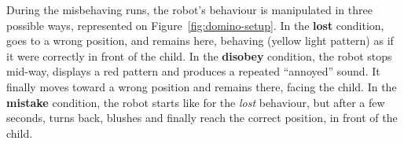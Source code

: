 \documentclass[letterpaper, 10pt, conference]{ieeeconf}
\begin{document}
%
%
%
%
%
%
%
During the misbehaving runs, the robot's behaviour is manipulated in three
possible ways, represented on Figure~\ref{fig:domino-setup}.
In the \textbf{lost} condition, goes to a wrong position, and remains here,
behaving (yellow light pattern) as if it were correctly in front of the child.
In the \textbf{disobey} condition, the robot stops mid-way, displays a red
pattern and produces a repeated ``annoyed'' sound. It finally moves toward a
wrong position and remains there, facing the child. In the \textbf{mistake}
condition, the robot starts like for the \emph{lost} behaviour, but after a few
seconds, turns back, blushes and finally reach the correct position, in front of
the child.
\end{document}
